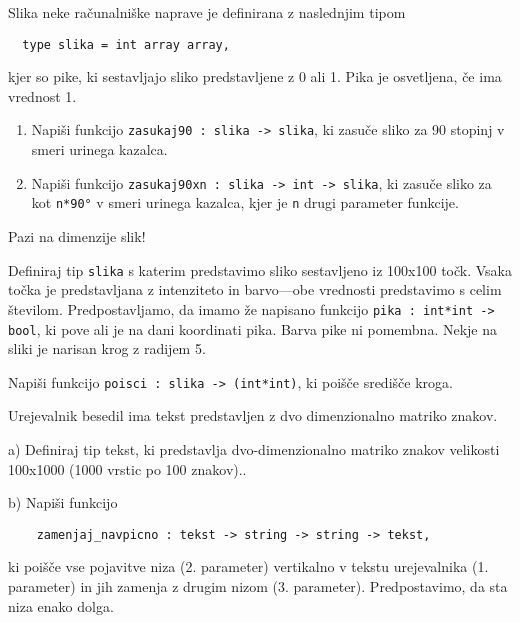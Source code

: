 \begin{ex}
  Slika neke ra\v cunalni\v ske naprave je definirana z naslednjim
  tipom

\begin{lstlisting}
  type slika = int array array,
\end{lstlisting}
  kjer so pike, ki sestavljajo sliko predstavljene z 0 ali 1. Pika je
  osvetljena, \v ce ima vrednost 1.

  \begin{enumerate}[label=(\roman*)]
  \item Napi\v si funkcijo \lstinline{zasukaj90 : slika -> slika}, ki
    zasu\v ce sliko za 90 stopinj v smeri urinega kazalca.

  \item Napi\v si funkcijo 
  \lstinline{zasukaj90xn : slika -> int -> slika}, 
  ki zasu\v ce sliko za kot \lstinline{n*90°} v smeri urinega
    kazalca, kjer je \lstinline{n} drugi parameter funkcije.
  \end{enumerate}

  Pazi na dimenzije slik!


\end{ex} 
\begin{ex}
  Definiraj tip \lstinline{slika} s katerim predstavimo sliko sestavljeno
  iz 100x100 to\v ck. Vsaka to\v cka je predstavljana z intenziteto in
  barvo---obe vrednosti predstavimo s celim \v stevilom.
  Predpostavljamo, da imamo \v ze napisano funkcijo \lstinline{pika : int*int -> bool}, 
  ki pove ali je na dani koordinati pika. Barva
  pike ni pomembna.
  Nekje na sliki je narisan krog z radijem 5. 
  
  \noindent Napi\v si funkcijo
  \lstinline{poisci : slika -> (int*int)}, ki poi\v s\v ce sredi\v s\v ce
  kroga.


\end{ex} 
\begin{ex}
  Urejevalnik besedil ima tekst predstavljen z dvo dimenzionalno
  matriko znakov.

  a) Definiraj tip tekst, ki predstavlja dvo-dimenzionalno matriko
  znakov velikosti 100x1000 (1000 vrstic po 100 znakov)..

  b) Napi\v si funkcijo

\begin{lstlisting}
    zamenjaj_navpicno : tekst -> string -> string -> tekst, 
\end{lstlisting}
  ki poi\v s\v ce vse pojavitve niza (2. parameter) vertikalno v
  tekstu urejevalnika (1. parameter) in jih zamenja z drugim nizom
  (3. parameter). Predpostavimo, da sta niza enako dolga.


\end{ex} 
